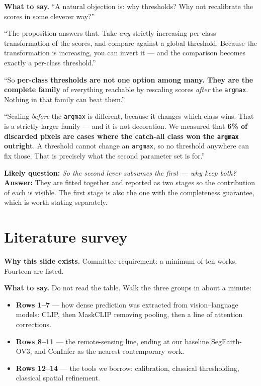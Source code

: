 \documentclass[11pt,a4paper]{article}
\newcommand{\best}[1]{\textcolor{acc}{\textbf{#1}}}
\newcommand{\why}[1]{\par\smallskip\noindent\textbf{Why this slide exists.} #1}
\newcommand{\say}[1]{\par\smallskip\noindent\textbf{What to say.} #1}
\newcommand{\ask}[2]{\par\smallskip\noindent\textbf{Likely question:} \emph{#1}\\
  \textbf{Answer:} #2}
\begin{document}
\say{``A natural objection is: why thresholds? Why not recalibrate the scores in
some cleverer way?''

\smallskip
``The proposition answers that. Take \emph{any} strictly increasing per-class
transformation of the scores, and compare against a global threshold. Because the
transformation is increasing, you can invert it --- and the comparison becomes
exactly a per-class threshold.''

\smallskip
``So \best{per-class thresholds are not one option among many. They are the
complete family} of everything reachable by rescaling scores \emph{after} the
\texttt{argmax}. Nothing in that family can beat them.''

\smallskip
``Scaling \emph{before} the \texttt{argmax} is different, because it changes
which class wins. That is a strictly larger family --- and it is not decoration.
We measured that \best{6\% of discarded pixels are cases where the catch-all
class won the \texttt{argmax} outright}. A threshold cannot change an
\texttt{argmax}, so no threshold anywhere can fix those. That is precisely what
the second parameter set is for.''}

\ask{So the second lever subsumes the first --- why keep both?}{They are fitted
together and reported as two stages so the contribution of each is visible. The
first stage is also the one with the completeness guarantee, which is worth
stating separately.}

\section{Literature survey}
\why{Committee requirement: a minimum of ten works. Fourteen are listed.}

\say{Do not read the table. Walk the three groups in about a minute:

\begin{itemize}[nosep,leftmargin=1.4em]
  \item \textbf{Rows 1--7} --- how dense prediction was extracted from
        vision--language models: CLIP, then MaskCLIP removing pooling, then a
        line of attention corrections.
  \item \textbf{Rows 8--11} --- the remote-sensing line, ending at our baseline
        SegEarth-OV3, and ConInfer as the nearest contemporary work.
  \item \textbf{Rows 12--14} --- the tools we borrow: calibration, classical
        thresholding, classical spatial refinement.
\end{itemize}}
\end{document}
